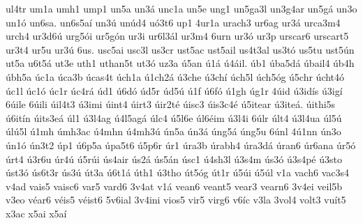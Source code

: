 {ul4tr
um1a
umh1
ump1
un5a
un3á
unc1a
un5e
ung1
un5ga3l
un3g4ar
un5gá
un3o
un1ó
un6sa.
un6s5aí
un3ú
unúd4
uó3t6
up1
4ur1a
urach3
ur6ag
ur3á
urca3m4
urch4
ur3d6ú
urg5ói
ur5gón
ur3i
ur6l3ál
ur3m4
6urn
ur3ó
ur3p
urscar6
urscart5
ur3t4
ur5u
ur3ú
6us.
usc5ai
usc3l
us3cr
ust5ac
ust5ail
us4t3al
us3tó
us5tu
ust5ún
ut5a
u6t5á
ut3e
uth1
uthan5t
ut3ó
uz3a
ú5an
ú1á
ú4áil.
úb1
úba5dá
úbail4
úb4h
úbh5a
úc1a
úca3b
úcas4t
úch1a
ú1ch2á
ú3che
ú3chí
úch5l
úch5óg
ú5chr
úcht4ó
úc1l
úc1ó
úc1r
úc4rá
úd1
ú6dó
úd5r
úd5ú
ú1f
ú6fó
ú1gh
úg1r
4úid
ú3idís
ú3igí
6úile
6úili
úil4t3
ú3imi
úint4
úirt3
úir2té
úisc3
úis3c4é
ú5itear
ú3iteá.
úithi5s
ú6itín
úits3eá
úl1
ú3l4ag
ú4l5agá
úlc4
ú5l6e
úl6éim
ú3l4i
6úlr
últ4
ú3l4ua
úl5ú
úlú5l
ú1mh
úmh3ac
ú4mhn
ú4mh3ú
ún5a
ún3á
úng5á
úng5u
6únl
4ú1nn
ún3o
ún1ó
ún3t2
úp1
ú6p5a
úpa5t6
ú5p6r
úr1
úra3b
úrabh4
úra3dá
úran6
úr6ana
úr5ó
úrt4
ú3r6u
úr4ú
ú5rúi
ús4air
ús2á
ús5án
úsc1
ú4sh3l
ú3s4m
ús3ó
ú3s4pé
ú3sto
úst3ó
ús6t3r
ús3ú
út3a
ú6t1á
úth1
ú3tho
út5óg
út1r
ú5úi
ú5úl
v1a
vach6
vac3s4
v4ad
vais5
vaisc6
var5
vard6
3v4at
v1á
vean6
veant5
vear3
vearn6
3v4ei
veil5b
v3eo
véar6
véis5
véist6
5v6ial
3v4ini
vios5
vir5
virg6
v6íc
v3la
3vol4
volt3
vuít5
x3ac
x5ai
x5aí
}

